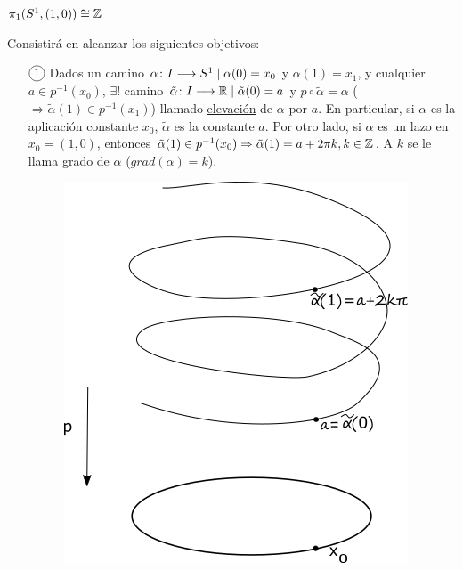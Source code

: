 \documentclass[GTS.tex]{subfiles}
\begin{document}
\begin{teorema}
$\pi_1(S^1,(1,0))\cong\mathbb{Z}$
\end{teorema}

\begin{dem}Consistirá en alcanzar los siguientes objetivos:
\begin{enumerate}
\item[$\circled{1}$] Dados un camino $\alpha\colon{I}\longrightarrow{S^1}\mid\alpha(0)=x_0$ y $\alpha(1)=x_1$, y cualquier $a\in p^{-1}(x_0)$, $\exists!$ camino $\tilde{\alpha}\colon{I}\longrightarrow{\mathbb{R}}\mid\tilde{\alpha}(0)=a$ y $p\circ\tilde{\alpha}=\alpha$ ($\Rightarrow \tilde{\alpha}(1)\in p^{-1}(x_1)$) llamado \underline{elevación} de $\alpha$ por $a$. En particular, si $\alpha$ es la aplicación constante $x_0$, $\tilde{\alpha}$ es la constante $a$. Por otro lado, si $\alpha$ es un lazo en $x_0=(1,0)$, entonces $\tilde{\alpha}(1)\in p^{-1}(x_0)\Rightarrow\tilde{\alpha}(1)=a+2\pi k, k\in\mathbb{Z}$. A $k$ se le llama grado de $\alpha$ ($grad(\alpha)=k$).

\begin{figure}[h!]
	\includegraphics[scale=0.5]{text4479}
\end{figure}


\end{enumerate}
\end{dem}
\end{document}
